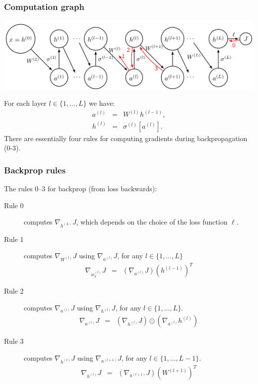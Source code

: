 \documentclass{beamer}
\begin{document}
\begin{frame}
  \frametitle{Computation graph}
  \includegraphics[width=\textwidth]{screenshot-backprop-figure}

For
each layer $l\in \{1, \dots, L\}$ we have:
\begin{eqnarray*}
  a^{(l)} &=&  W^{(l)} h^{(l-1)}, \\
  h^{(l)} &=& \sigma^{(l)}\left[ a^{(l)} \right].
\end{eqnarray*}
There are essentially four rules for computing gradients during
backpropagation (0-3).
  
\end{frame}

\begin{frame}
  \frametitle{Backprop rules}
  The rules 0--3 for backprop (from loss backwards):
\begin{description}
\item[Rule 0] computes $\nabla_{h^{(L)}} J$, which depends on the
  choice of the loss function $\ell$.
\item[Rule 1] computes
  $\nabla_{W^{(l)}} J$ using $\nabla_{a^{(l)}} J$, for any $l\in\{1,\dots,L\}$
\begin{eqnarray}
  \nabla_{w_k^{(l)}} J
  &=& \left(\nabla_{a^{(l)}} J\right)
      \left( h^{(l-1)} \right)^T \label{eq:grad-loss-w}
\end{eqnarray}
\item[Rule 2] computes
  $\nabla_{a^{(l)}} J$ using $\nabla_{h^{(l)}} J$, for any $l\in\{1,\dots,L\}$.
\begin{eqnarray}
  \nabla_{a^{(l)}} J
  &=& \left(\nabla_{h^{(l)}} J\right) \odot
      \label{eq:grad-loss-a}
      \left(\nabla_{a^{(l)}} h^{(l)} \right) 
\end{eqnarray}
\item[Rule 3] computes
  $\nabla_{h^{(l)}} J$ using $\nabla_{a^{(l+1)}} J$, for any $l\in\{1,\dots,L-1\}$.
\begin{eqnarray}
  \nabla_{h^{(l)}} J
  &=& \left(\nabla_{a^{(l+1)}} J\right)
      \left(W^{(l+1)}\right)^T \label{eq:grad-loss-h}
\end{eqnarray}
\end{description}

\end{frame}
\end{document}
